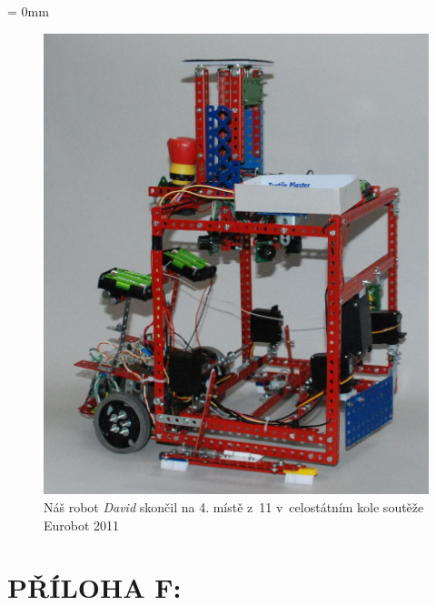 \documentclass[12pt, a4paper, oneside]{article}
\newcommand{\It}{\textit}  %
\begin{document}
\pagestyle{plain}
\textheight=592pt
\textwidth=392pt
\newpage
\voffset = 0mm
\begin{figure}[H]
\begin{center}
\includegraphics[width=\textwidth]{img/use_david_robot.jpg}
\caption{Náš robot \It{David} skončil na 4. místě z~11 v~celostátním kole soutěže Eurobot 2011}
\label{david}
\end{center}
\end{figure}


\newpage
\section*{PŘÍLOHA F:}
~
\listoffigures   %
\end{document}
